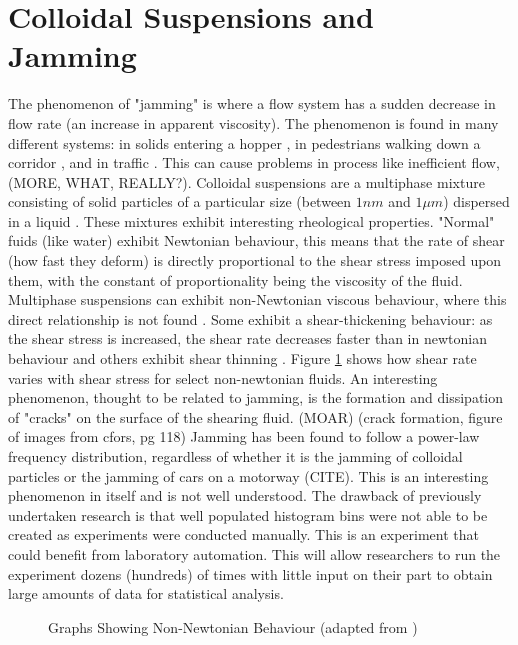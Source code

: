 \documentclass[a4]{report}
\begin{document}
	\section{Colloidal Suspensions and Jamming}
	The phenomenon of "jamming" is where a flow system has a sudden decrease in flow rate (an increase in apparent viscosity). The phenomenon is found in many different systems: in solids entering a hopper \cite{back2djam}, in pedestrians walking down a corridor \cite{backpedjam}, and in traffic \cite{backcarjam}. This can cause problems in process like inefficient flow, (MORE, WHAT, REALLY?). \newline \newline \noindent
	Colloidal suspensions are a multiphase mixture consisting of solid particles of a particular size (between \(1nm\) and \(1 \mu m\)) dispersed in a liquid \cite[p.~72]{schadict}. These mixtures exhibit interesting rheological properties. "Normal" fuids (like water) exhibit Newtonian behaviour, this means that the rate of shear (how fast they deform) is directly proportional to the shear stress imposed upon them, with the constant of proportionality being the viscosity of the fluid\cite[p.~252]{schadict}. Multiphase suspensions can exhibit non-Newtonian viscous behaviour, where this direct relationship is not found \cite[p.~255-256]{schadict}. Some exhibit a shear-thickening behaviour: as the shear stress is increased, the shear rate decreases faster than in newtonian behaviour and others exhibit shear thinning \cite{backtypesofnonnewt}. Figure \ref{nonnewtgraphs} shows how shear rate varies with shear stress for select non-newtonian fluids.  \newline \newline \noindent
	An interesting phenomenon, thought to be related to jamming, is the formation and dissipation of "cracks" on the surface of the shearing fluid. (MOAR) (crack formation, figure of images from cfors, pg 118) \newline \newline \noindent
	Jamming has been found to follow a power-law frequency distribution, regardless of whether it is the jamming of colloidal particles or the jamming of cars on a motorway (CITE). This is an interesting phenomenon in itself and is not well understood. The drawback of previously undertaken research is that well populated histogram bins were not able to be created as experiments were conducted manually. This is an experiment that could benefit from laboratory automation. This will allow researchers to run the experiment dozens (hundreds) of times with little input on their part to obtain large amounts of data for statistical analysis. \newline
	\begin{figure}[!h]
	\centering
	\caption{Graphs Showing Non-Newtonian Behaviour (adapted from \cite{figshearthin, figshearthick})}
	\label{nonnewtgraphs}
	\end{figure} \newline  \noindent
\end{document}
